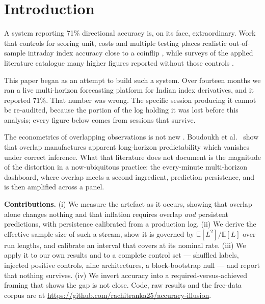 \documentclass[sigconf,nonacm]{acmart}
\begin{document}

\maketitle

\section{Introduction}

A system reporting 71\% directional accuracy is, on its face, extraordinary.
Work that controls for scoring unit, costs and multiple testing places realistic
out-of-sample intraday index accuracy close to a coinflip
\cite{timmermann2004,sullivan1999}, while surveys of the applied literature
catalogue many higher figures reported without those controls \cite{sezer2020}.

This paper began as an attempt to build such a system. Over fourteen months we
ran a live multi-horizon forecasting platform for Indian index derivatives, and
it reported 71\%. That number was wrong. The specific session producing it
cannot be re-audited, because the portion of the log holding it was lost before
this analysis; every figure below comes from sessions that survive.

The econometrics of overlapping observations is not new
\cite{hansen1980,richardson1991}. Boudoukh et al.\ \cite{boudoukh2008} show that
overlap manufactures apparent long-horizon predictability which vanishes under
correct inference. What that literature does not document is the magnitude of
the distortion in a now-ubiquitous practice: the every-minute multi-horizon
dashboard, where overlap meets a second ingredient, prediction persistence, and
is then amplified across a panel.

\textbf{Contributions.} (i) We measure the artefact as it occurs, showing that
overlap alone changes nothing and that inflation requires overlap \emph{and}
persistent predictions, with persistence calibrated from a production log.
(ii) We derive the effective sample size of such a stream, show it is governed
by $\mathbb{E}[L^2]/\mathbb{E}[L]$ over run lengths, and calibrate an interval
that covers at its nominal rate. (iii) We apply it to our own results and to a
complete control set --- shuffled labels, injected positive controls, nine
architectures, a block-bootstrap null --- and report that nothing survives.
(iv) We invert accuracy into a required-versus-achieved framing that shows the
gap is not close. Code, raw results and the free-data corpus are at
\url{https://github.com/rachitranka25/accuracy-illusion}.
\end{document}
